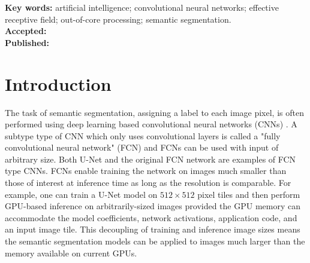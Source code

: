 \documentclass[10pt, indentfirst]{article}
\renewcommand{\headrulewidth}{.5pt}
\renewcommand{\footrulewidth}{0pt}
\begin{document}
\begin{flushleft}
	
	
	\vspace{8pt} 
	\textbf{Key words:} artificial intelligence; convolutional neural networks; effective receptive field; out-of-core processing; semantic segmentation. \\ %
	\vspace{8pt} 
	\textbf{Accepted:} \accepted \\
	\vspace{8pt} 
	\textbf{Published:} \published \\ %
	\vspace{8pt} 
	\DOI
\end{flushleft}
\vspace{-15pt}
\LARGE \hrulefill

\setlength{\abovedisplayskip}{19pt}
\setlength{\belowdisplayskip}{19pt}
\setlength{\abovedisplayshortskip}{9pt}
\setlength{\belowdisplayshortskip}{19pt}

\raggedright
\setlength\parindent{16pt}

\pagestyle{fancy}
\renewcommand{\headrulewidth}{.5pt}
  \renewcommand{\footrulewidth}{0pt}
  \fancyhead{}


\fancyfoot{} 
\fancyfoot[c]{\thepage}
\fancyfoot[r]{\DOI}



\section{Introduction}


\normalsize

The task of semantic segmentation, assigning a label to each image pixel, is often performed using deep learning based convolutional neural networks (CNNs) \citep{Badrinarayanan2015a,Ronneberger2015a}. A subtype type of CNN which only uses convolutional layers is called a "fully convolutional neural network" (FCN) and FCNs can be used with input of arbitrary size. Both U-Net \citep{Ronneberger2015a} and the original FCN network \citep{Long2015} are examples of FCN type CNNs. 
FCNs enable training the network on images much smaller than those of interest at inference time as long as the resolution is comparable. 
For example, one can train a U-Net model on $512 \times 512$ pixel tiles and then perform GPU-based inference on arbitrarily-sized images provided the GPU memory can accommodate the model coefficients, network activations, application code, and an input image tile. This decoupling of training and inference image sizes means the semantic segmentation models can be applied to images much larger than the memory available on current GPUs. 
\end{document}
